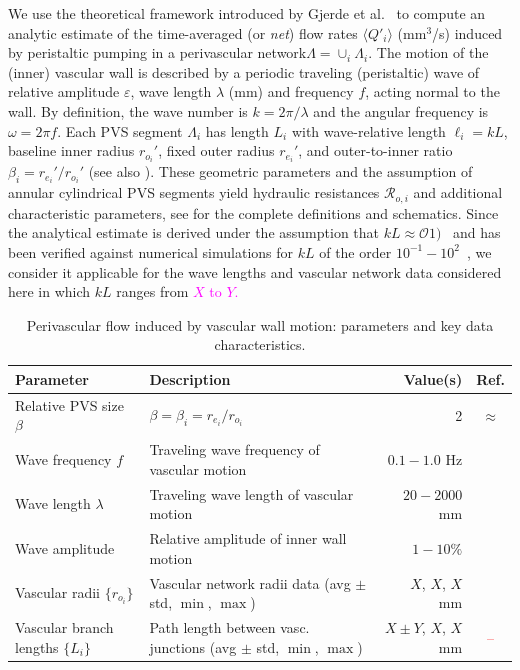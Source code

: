 \documentclass[fleqn,10pt]{wlscirep}
\newcommand{\mer}[1]{\textcolor{magenta}{#1}}
\newcommand{\discuss}[1]{\textcolor{red}{#1}}
\begin{document}
We use the theoretical framework introduced by Gjerde et al.~\cite{gjerde2023directional} to compute an analytic estimate of the time-averaged (or \emph{net}) flow rates $\langle Q'_i \rangle$ (mm$^3$/s) induced by peristaltic pumping in a perivascular network$\Lambda = \cup_i \Lambda_i$. The motion of the (inner) vascular wall is described by a periodic traveling (peristaltic) wave of relative amplitude $\varepsilon$, wave length $\lambda$ (mm) and frequency $f$, acting normal to the wall. By definition, the wave number is $k = 2 \pi/\lambda$ and the angular frequency is $\omega = 2 \pi f$. Each PVS segment $\Lambda_i$ has length $L_i$ with wave-relative length $\ell_i = k L$, baseline inner radius $r_{o_i}'$, fixed outer radius $r_{e_i}'$, and outer-to-inner ratio $\beta_i = r_{e_i}'/r_{o_i}'$ (see also ). These geometric parameters and the assumption of annular cylindrical PVS segments yield hydraulic resistances $\mathcal{R}_{o, i}$ and additional characteristic parameters, see \cite{gjerde2023directional} for the complete definitions and schematics. Since the analytical estimate is derived under the assumption that $k L \approx \mathcal{O} 1)$~\cite{gjerde2023directional} and has been verified against numerical simulations for $k L$ of the order $10^{-1}-10^2$~\cite[Table I]{gjerde2023directional}, we consider it applicable for the wave lengths and vascular network data considered here in which $k L$ ranges from \mer{$X$ to $Y$.}

\begin{table}
  \small
  \begin{tabular}{llrc}
    \toprule
    Parameter & Description & Value(s)  & Ref.\\ 
    \midrule
    Relative PVS size $\beta$ & $\beta = \beta_i = r_{e_i} / r_{o_i}$ & 2 & $\approx$\cite{eide2024functional} \\
    Wave frequency $f$ & Traveling wave frequency of vascular motion & $0.1-1.0$ Hz & \discuss{\cite{gjerde2023directional}} \\
    Wave length $\lambda$ & Traveling wave length of vascular motion & $20-2000$ mm & \discuss{\cite{broggini2024long, gjerde2023directional}} \\
    Wave amplitude & Relative amplitude of inner wall motion & $1-10\%$ & \discuss{\cite{gjerde2023directional}} \\
    Vascular radii $\{r_{o_i}\}$ & Vascular network radii data (avg $\pm$ std, $\min$, $\max$) & $X$, $X$, $X$  mm & \cite{hodneland2019new} \\
    Vascular branch lengths $\{L_{i}\}$ & Path length between vasc. junctions (avg $\pm$ std, $\min$, $\max$) & $X \pm Y$, $X$, $X$  mm & \discuss{--} \\
    \bottomrule
  \end{tabular}
  \caption{Perivascular flow induced by vascular wall motion: parameters and key data characteristics.}
  \label{tab:pvs:parameters}
\end{table}
\end{document}
